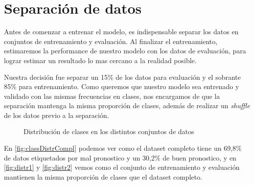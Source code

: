 \section*{Separación de datos}
Antes de comenzar a entrenar el modelo, es indispensable separar los datos en conjuntos de entrenamiento y evaluación.
Al finalizar el entrenamiento, estimaremos la performance de nuestro modelo con los datos de evaluación, para lograr estimar un resultado  lo mas cercano a la realidad posible.

Nuestra decisión fue separar un 15\% de los datos para evaluación y el sobrante 85\% para entrenamiento.
Como queremos que nuestro modelo sea entrenado y validado con las mismas frecuencias en clases,
nos encargamos de que la separación mantenga la misma proporción de clases, además de realizar un \textit{shuffle} de los datos previo a la separación.


\begin{figure}[H]
    \centering
    \hspace{0.05\linewidth}
    \hspace{0.05\linewidth}
    \caption{Distribución de clases en los distintos conjuntos de datos}
    \label{fig:distr}
\end{figure}


En \ref{fig:classDistrCompl} podemos ver como el dataset completo tiene un 69,8\% de datos etiquetados por mal pronostico y un 30,2\% de buen pronostico, y en \ref{fig:distr1} y \ref{fig:distr2} vemos como el conjunto de entrenamiento y evaluación 
mantienen la misma proporción de clases que el dataset completo.
